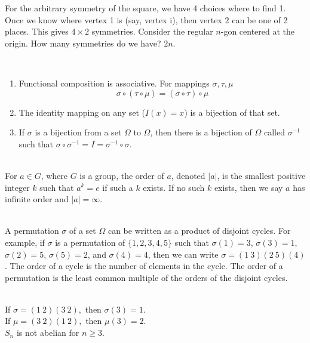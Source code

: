 
For the arbitrary symmetry of the square, we have 4 choices where to find 1. Once we know where vertex 1 is (say, vertex i), then vertex 2 can be one of 2 places. This gives $4\times2$ symmetries. Consider the regular $n$-gon centered at the origin. How many symmetries do we have? $2n$.

\begin{fact}  \leavevmode \\
\begin{enumerate}
    \item Functional composition is associative. For mappings $\sigma, \tau, \mu$
    $$\sigma \circ (\tau \circ \mu) = (\sigma \circ \tau) \circ \mu$$
    \item The identity mapping on any set ($I(x) = x$) is a bijection of that set.
    \item If $\sigma$ is a bijection from a set $\Omega$ to $\Omega$, then there is a bijection of $\Omega$ called $\sigma^{-1}$ such that $\sigma \circ \sigma^{-1} = I = \sigma^{-1} \circ \sigma$.
\end{enumerate}
\end{fact}

\begin{definition}[Order] \leavevmode \\
    For $a\in G$, where $G$ is a group, the order of $a$, denoted $|a|$, is the smallest positive integer $k$ such that $a^k = e$ if such a $k$ exists. If no such $k$ exists, then we say $a$ has infinite order and $|a| = \infty$.
\end{definition}

\begin{notation} \leavevmode \\
    A permutation $\sigma$ of a set $\Omega$ can be written as a product of disjoint cycles. For example, if $\sigma$ is a permutation of $\{1,2,3,4,5\}$ such that $\sigma(1)=3$, $\sigma(3)=1$, $\sigma(2)=5$, $\sigma(5)=2$, and $\sigma(4)=4$, then we can write $\sigma = (1~3)(2~5)(4)$. The order of a cycle is the number of elements in the cycle. The order of a permutation is the least common multiple of the orders of the disjoint cycles.
\end{notation}

\begin{example} \leavevmode \\
  If $\sigma = (1~2)(3~2),$ then $\sigma(3) = 1$. \\
  If $\mu = (3~2)(1~2),$ then $\mu(3) = 2$. \\
  $S_n$ is not abelian for $n \geq 3$.
\end{example}
